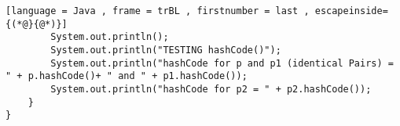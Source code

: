 \begin{enumerate}[label=(\alph*),align=left, wide, labelwidth=!, labelindent=0pt]
\begin{lstlisting}[language = Java , frame = trBL , firstnumber = last , escapeinside={(*@}{@*)}]
        System.out.println();
        System.out.println("TESTING hashCode()");
        System.out.println("hashCode for p and p1 (identical Pairs) = " + p.hashCode()+ " and " + p1.hashCode());
        System.out.println("hashCode for p2 = " + p2.hashCode());
    }
}
 \end{lstlisting}


\end{enumerate}
  		

  	

